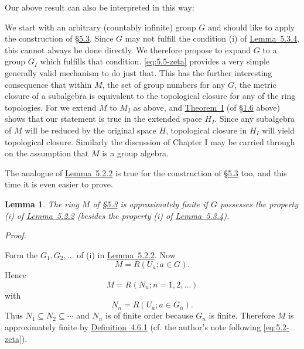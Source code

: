 \documentclass[b5paper,twoside]{article}
\newcommand{\secref}[2]{\hyperref[#1]{\mbox{\S#2}}}
\newcommand{\thmref}[2]{\hyperref[#1]{\mbox{Theorem~#2}}}
\newcommand{\lemref}[2]{\hyperref[#1]{\mbox{Lemma~#2}}}
\newcommand{\defref}[2]{\hyperref[#1]{\mbox{Definition~#2}}}
\theoremstyle{mvnplain}
\newtheorem{lemma}{Lemma}[section]
\renewenvironment{proof}[1][Proof]{%
  \par\addvspace{0.35\baselineskip}%
  \noindent\textit{#1.}\ \normalfont\ignorespaces
}{%
  \par\addvspace{0.35\baselineskip}%
}
\newcommand{\M}{\mathbf M}
\newcommand{\N}{\mathbf N}
\newcommand{\R}{\mathbf R}
\newcommand{\Hilbert}{\mathfrak H}
\def\M{M}%
\def\N{N}%
\def\R{R}%
\def\Hilbert{H}%
\def\mathfrak#1{#1}%
\begin{document}
Our above result can also be interpreted in this way:

We start with an arbitrary (countably infinite) group \(\mathfrak G\) and
should like to apply the construction of \secref{sec:5.3}{5.3}. Since
\(\mathfrak G\) may not fulfill the condition (i) of
\lemref{lem:5.3.4}{5.3.4}, this cannot always be done directly. We therefore
propose to expand \(\mathfrak G\) to a group \(\mathfrak G_I\) which fulfills
that condition. \eqref{eq:5.5-zeta} provides a very simple generally valid
mechanism to do just that. This has the further interesting consequence that
within \(\M\), the set of group numbers for any \(\mathfrak G\), the metric
closure of a subalgebra is equivalent to the topological closure for any of the
ring topologies. For we extend \(\M\) to \(\M_I\) as above, and
\thmref{thm:I}{I} (of \secref{sec:1.6}{1.6} above) shows that our statement
is true in the extended space \(\Hilbert_I\). Since any subalgebra of \(\M\)
will be reduced by the original space \(\Hilbert\), topological closure in
\(\Hilbert_I\) will yield topological closure. Similarly the discussion of
Chapter I may be carried through on the assumption that \(\M\) is a group
algebra.

The analogue of \lemref{lem:5.2.2}{5.2.2} is true for the construction of
\secref{sec:5.3}{5.3} too, and this time it is even easier to prove.

\begin{lemma}\label{lem:5.6.1}
The ring \(\M\) of \secref{sec:5.3}{5.3} is approximately finite if
\(\mathfrak G\) possesses the property (i) of \lemref{lem:5.2.2}{5.2.2}
(besides the property (i) of \lemref{lem:5.3.4}{5.3.4}).
\end{lemma}

\begin{proof}
Form the \(\mathfrak G_1,\mathfrak G_2,\ldots\) of (i) in
\lemref{lem:5.2.2}{5.2.2}. Now
\[
 \M=\R(U_a;a\in\mathfrak G).
\]
Hence
\[
 \M=\R(\N_n;n=1,2,\ldots)
\]
with
\[
 \N_n=\R(U_a;a\in\mathfrak G_n).
\]
Thus \(\N_1\subseteq\N_2\subseteq\cdots\) and \(\N_n\) is of finite order
because \(\mathfrak G_n\) is finite. Therefore \(\M\) is approximately finite
by \defref{def:4.6.1}{4.6.1} (cf. the author's note following
\eqref{eq:5.2-zeta}).
\end{proof}
\end{document}
